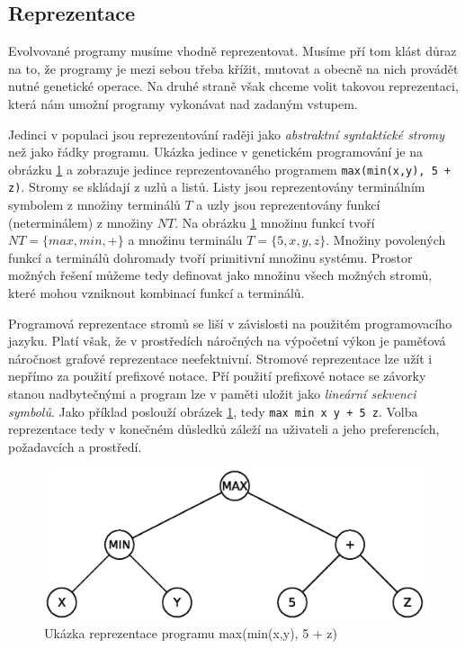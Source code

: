 \subsection{Reprezentace}
Evolvované programy musíme vhodně reprezentovat. Musíme pří tom klást důraz na to,
že programy je mezi sebou třeba křížit, mutovat a obecně na nich provádět nutné
genetické operace. Na druhé straně však chceme volit takovou reprezentaci, která
nám umožní programy vykonávat nad zadaným vstupem. 

Jedinci v populaci jsou reprezentování raději jako \textit{abstraktní syntaktické stromy}
\cite{GPTutorial} než jako řádky programu. Ukázka jedince v genetickém programování je na
obrázku \ref{fig:exampletree1} a zobrazuje jedince reprezentovaného programem
\texttt{max(min(x,y), 5 + z)}. Stromy se skládají z uzlů a listů. Listy jsou
reprezentovány terminálním symbolem z množiny terminálů $T$ a uzly jsou reprezentovány
funkcí (neterminálem) z množiny $NT$. Na obrázku \ref{fig:exampletree1} množinu funkcí tvoří 
$NT = \{max, min, +\}$ a množinu terminálu $T = \{5, x, y, z\}$. Množiny povolených
funkcí a terminálů dohromady tvoří primitivní množinu systému. Prostor možných 
řešení můžeme tedy definovat jako množinu všech možných stromů, které mohou vzniknout
kombinací funkcí a terminálů.

Programová reprezentace stromů se liší v závislosti na použitém programovacího jazyku.
Platí však, že 
v prostředích náročných na výpočetní výkon je paměťová náročnost grafové reprezentace
neefektnivní. Stromové reprezentace lze užít i nepřímo za použití prefixové notace.
Pří použití prefixové notace se závorky stanou nadbytečnými a program lze v paměti
uložit jako \textit{lineární sekvenci symbolů}. Jako příklad poslouží obrázek 
\ref{fig:exampletree1}, tedy \texttt{max min x y + 5 z}. Volba reprezentace tedy
v konečném důsledků záleží na uživateli a jeho preferencích, požadavcích a prostředí. 

\begin{figure}[!ht]
	\centering
	\includegraphics[scale=0.6]{fig/example_tree1}	
	\caption{Ukázka reprezentace programu max(min(x,y), 5 + z)}
	\label{fig:exampletree1}
\end{figure}

